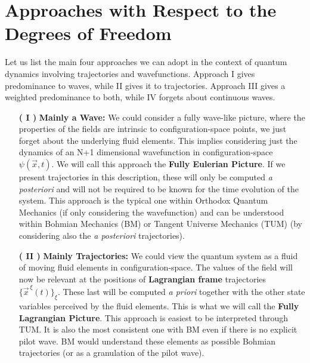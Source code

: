 \documentclass[11pt, a4paper]{article} %
\begin{document}

\section*{Approaches with Respect to the Degrees of Freedom}
\vspace{-0.2cm}

Let us list the main four approaches we can adopt in the context of quantum dynamics involving trajectories and wavefunctions. Approach I gives predominance to waves, while II gives it to trajectories. Approach III gives a weighted predominance to both, while IV forgets about continuous waves.
\vspace{-0.2cm}
\begin{enumerate}
\item[\bf ( I )] {\bf Mainly a Wave: } We could consider a fully wave-like picture, where the properties of the fields are intrinsic to configuration-space points, we just forget about the underlying fluid elements. This implies considering just the dynamics of an N+1 dimensional wavefunction in configuration-space $\psi(\vec{x},t)$. We will call this approach the {\bf Fully Eulerian Picture}. If we present trajectories in this description, these will only be computed {\em a posteriori} and will not be required to be known for the time evolution of the system. This approach is the typical one within Orthodox Quantum Mechanics (if only considering the wavefunction) and can be understood within Bohmian Mechanics (BM) or Tangent Universe Mechanics (TUM) (by considering also the {\em a posteriori} trajectories).


\item[\bf ( II )]{\bf Mainly Trajectories:} We could view the quantum system as a fluid of moving fluid elements in configuration-space. The values of the field will now be relevant at the positions of {\bf Lagrangian frame} trajectories $\{\vec{x}^{\, \xi}(t)\}_\xi$. These last will be computed {\em a priori} together with the other state variables perceived by the fluid elements. This is what we will call the {\bf Fully Lagrangian Picture}. This approach is easiest to be interpreted through TUM. It is also the most consistent one with BM even if there is no explicit pilot wave. BM would understand these elements as possible Bohmian trajectories (or as a granulation of the pilot wave).


\end{enumerate}
\end{document}
